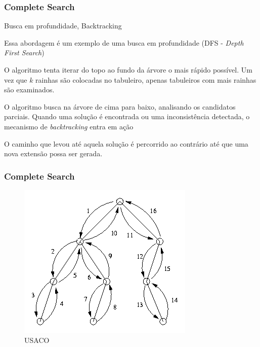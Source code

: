 \begin{frame}
\frametitle{Complete Search}

\begin{block}{Busca em profundidade, Backtracking}

\begin{itemize}
	\bitem Essa abordagem é um exemplo de uma busca em profundidade (DFS - \emph{Depth First Search})
	\begin{itemize}
		\bitem O algoritmo tenta iterar do topo ao fundo da árvore o mais rápido possível.
		\bitem Um vez que $k$ rainhas são colocadas no tabuleiro, apenas tabuleiros com mais rainhas são examinados.
	\end{itemize}
	\bitem O algoritmo busca na árvore de cima para baixo, analisando os candidatos parciais.
	\bitem Quando uma solução é encontrada ou uma inconsistência detectada, o mecanismo de \emph{backtracking} entra em ação
	\begin{itemize}
		\bitem O caminho que levou até aquela solução é percorrido ao contrário até que uma nova extensão possa ser gerada.
	\end{itemize}
\end{itemize}
\end{block}
\end{frame}

\begin{frame}
\frametitle{Complete Search}
	\begin{center}
		\begin{figure}
			\includegraphics[width=.52\textwidth]{figuras/dfs.png}
			\caption{USACO}
		\end{figure}
	\end{center}
\end{frame}

